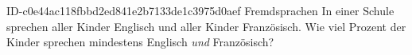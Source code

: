 \begin{exercise}
      {ID-c0e44ac118fbbd2ed841e2b7133de1c3975d0aef}
      {Fremdsprachen}
  \ifproblem\problem
    In einer Schule sprechen  aller Kinder Englisch und 
    aller Kinder Französisch. Wie viel Prozent der Kinder sprechen
    mindestens Englisch \emph{und} Französisch?
  \fi
\end{exercise}
